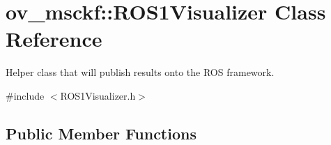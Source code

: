 \hypertarget{classov__msckf_1_1ROS1Visualizer}{}\section{ov\+\_\+msckf\+:\+:R\+O\+S1\+Visualizer Class Reference}
\label{classov__msckf_1_1ROS1Visualizer}


Helper class that will publish results onto the R\+OS framework.  




{\ttfamily \#include $<$R\+O\+S1\+Visualizer.\+h$>$}

\subsection*{Public Member Functions}
